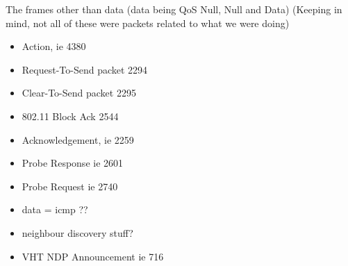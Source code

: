 The frames other than data (data being QoS Null, Null and Data)
(Keeping in mind, not all of these were packets related to what we were doing)
\begin{itemize}
\item Action, ie 4380
\item Request-To-Send packet 2294
\item Clear-To-Send packet 2295
\item 802.11 Block Ack 2544
\item Acknowledgement, ie 2259
\item Probe Response ie 2601
\item Probe Request ie 2740
\item data = icmp ??
\item neighbour discovery stuff?
\item VHT NDP Announcement ie 716
\end{itemize}


%
%
%
